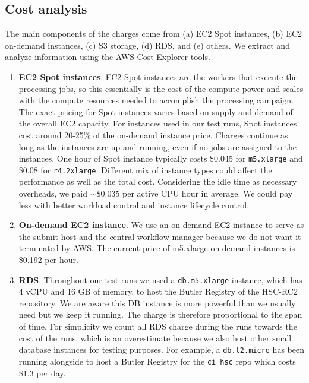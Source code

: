 \subsection{Cost analysis}

The main components of the charges come from (a) EC2 Spot instances, (b) EC2 on-demand instances, (c) S3 storage, (d) RDS, and (e) others.
We extract and analyze information using the AWS Cost Explorer tools.

\begin{enumerate}
\item \textbf{EC2 Spot instances}.
EC2 Spot instances are the workers that execute the processing jobs, so this essentially is the cost of the compute power and scales with the compute resources needed to accomplish the processing campaign.
The exact pricing for Spot instances varies based on supply and demand of the overall EC2 capacity.
For instances used in our test runs, Spot instances cost around 20-25\% of the on-demand instance price.
Charges continue as long as the instances are up and running, even if no jobs are assigned to the instances.
One hour of Spot instance typically costs \$0.045 for \texttt{m5.xlarge} and \$0.08 for \texttt{r4.2xlarge}.
Different mix of instance types could affect the performance as well as the total cost.
Considering the idle time as necessary overheads, we paid $\sim$\$0.035 per active CPU hour in average.
We could pay less with better workload control and instance lifecycle control.

\item \textbf{On-demand EC2 instance}.
We use an on-demand EC2 instance to serve as the submit host and the central workflow manager because we do not want it terminated by AWS.
The current price of m5.xlarge on-demand instances is \$0.192 per hour.

\item \textbf{RDS}.
Throughout our test runs we used a \texttt{db.m5.xlarge} instance, which has 4 vCPU and 16 GB of memory, to host the Butler Registry of the HSC-RC2 repository.
We are aware this DB instance is more powerful than we usually need but we keep it running.
The charge is therefore proportional to the span of time.
For simplicity we count all RDS charge during the runs towards the cost of the runs, which is an overestimate because we also host other small database instances for testing purposes.
For example, a \texttt{db.t2.micro} has been running alongside to host a Butler Registry for the \texttt{ci\_hsc} repo which costs \$1.3 per day.


\end{enumerate}
